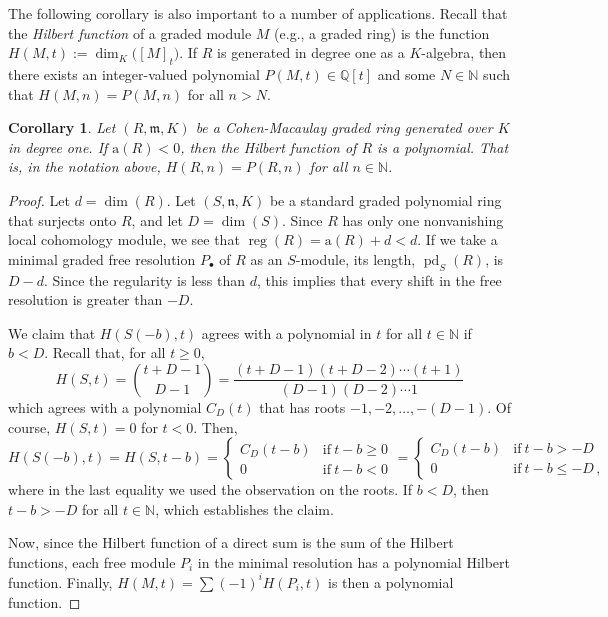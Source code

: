 \documentclass[11pt]{book}
\newtheorem{corollary}[theorem]{Corollary}
\numberwithin{equation}{section}
\numberwithin{theorem}{chapter}
\theoremstyle{definition}
\newtheorem*{basic properties}{Basic Properties}
\newtheorem*{Important Remark}{Important Remark}
\theoremstyle{remark}
\newcommand{\NN}{\mathbb{N}}
\newcommand{\QQ}{\mathbb{Q}}
\newcommand{\m}{\mathfrak{m}}
\newcommand{\n}{\mathfrak{n}}
\renewcommand{\dim}{\operatorname{dim}}
\newcommand{\reg}{\operatorname{reg}}
\newcommand{\pd}{\operatorname{pd}}
\newcommand{\ai}{\mathrm{a}}
\begin{document}
The following corollary is also important to a number of applications. Recall that the \emph{Hilbert function} of a graded module $M$ (e.g., a graded ring) is the function $H(M,t):=\dim_K \big( [M]_t \big)$. If $R$ is generated in degree one as a $K$-algebra, then there exists an integer-valued polynomial $P(M,t)\in \QQ[t]$ and some $N\in \NN$ such that $H(M,n)=P(M,n)$ for all $n>N$.

\begin{corollary}
	Let $(R,\m,K)$ be a Cohen-Macaulay graded ring generated over $K$ in degree one. If $\ai(R)<0$, then the Hilbert function of $R$ \emph{is} a polynomial. That is, in the notation above, $H(R,n)=P(R,n)$ for all $n\in \NN$.
\end{corollary}
\begin{proof}
	Let $d=\dim(R)$. Let $(S,\n,K)$ be a standard graded polynomial ring that surjects onto $R$, and let $D=\dim(S)$. Since $R$ has only one nonvanishing local cohomology module, we see that $\reg(R) = \ai(R) + d < d$. If we take a minimal graded free resolution $P_\bullet$ of $R$ as an $S$-module, its length, $\pd_S(R)$, is $D-d$. Since the regularity is less than $d$, this implies that every shift in the free resolution is greater than $-D$.
	
	We claim that $H(S(-b),t)$ agrees with a polynomial in $t$ for all $t\in \NN$ if $b<D$. Recall that, for all $t\geq 0$,
	\[H(S,t)=\binom{t+D-1}{D-1}=\frac{(t+D-1) (t+D-2)\cdots (t+1)}{(D-1) (D-2) \cdots 1} \]
	 which agrees with a polynomial $C_D(t)$ that has roots $-1,-2,\dots,-(D-1)$. Of course, $H(S,t)=0$ for $t<0$. Then,
	 \[ H(S(-b),t)=H(S,t-b)=\begin{cases} C_D(t-b) & \text{if} \ t-b\geq 0 \\  0 & \text{if} \ t-b< 0 \end{cases} =\begin{cases} C_D(t-b) & \text{if} \ t-b > -D \\  0 & \text{if} \ t-b \leq -D\,, \end{cases}\]
	 where in the last equality we used the observation on the roots. If $b<D$, then $t-b>-D$ for all $t\in \NN$, which establishes the claim.
	 
	 Now, since the Hilbert function of a direct sum is the sum of the Hilbert functions, each free module $P_i$ in the minimal resolution has a polynomial Hilbert function. Finally, $H(M,t)=\sum (-1)^i H(P_i,t)$ is then a polynomial function.
\end{proof}
\end{document}

